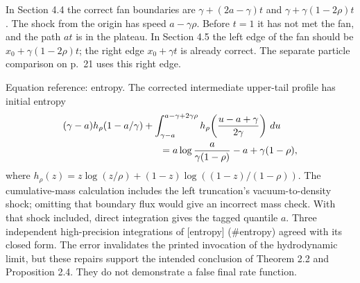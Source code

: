 \documentclass[10pt]{article}
\begin{document}
In Section 4.4 the correct fan boundaries are \(\gamma+(2a-\gamma)t\) and \(\gamma+\gamma(1-2\rho)t\). The shock from the origin has speed \(a-\gamma\rho\). Before \(t=1\) it has not met the fan, and the path \(at\) is in the plateau. In Section 4.5 the left edge of the fan should be \(x_0+\gamma(1-2\rho)t\); the right edge \(x_0+\gamma t\) is already correct. The separate particle comparison on p. 21 uses this right edge.\par
Equation reference: entropy. The corrected intermediate upper-tail profile has initial entropy \[\begin{aligned}
 &(\gamma-a)h_\rho(1-a/\gamma)
 +\int_{\gamma-a}^{a-\gamma+2\gamma\rho}
        h_\rho\!\left(\frac{u-a+\gamma}{2\gamma}\right)\,du \notag\\
 &\hspace{35mm}=a\log\frac{a}{\gamma(1-\rho)}-a+\gamma(1-\rho),\end{aligned}\] where \(h_\rho(z)=z\log(z/\rho)+(1-z)\log((1-z)/(1-\rho))\). The cumulative-mass calculation includes the left truncation’s vacuum-to-density shock; omitting that boundary flux would give an incorrect mass check. With that shock included, direct integration gives the tagged quantile \(a\). Three independent high-precision integrations of [entropy] (\#entropy) agreed with its closed form. The error invalidates the printed invocation of the hydrodynamic limit, but these repairs support the intended conclusion of Theorem 2.2 and Proposition 2.4. They do not demonstrate a false final rate function.\par
\end{document}
